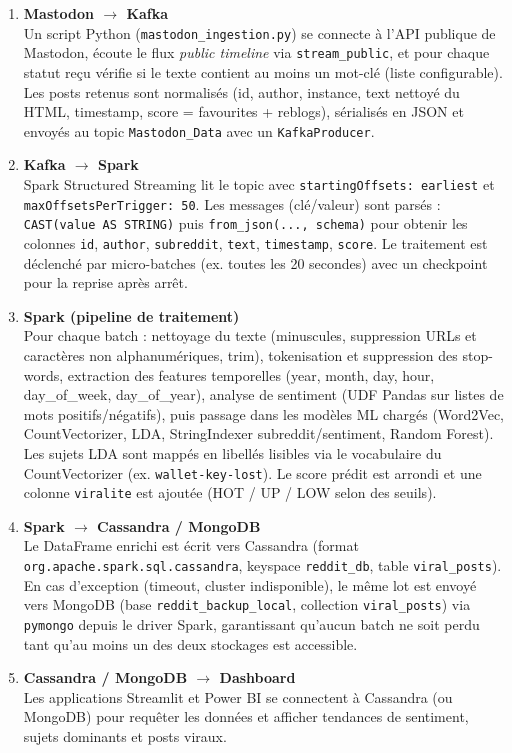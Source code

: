 \documentclass[12pt,a4paper]{article}
\begin{document}
\begin{enumerate}[leftmargin=*]
  \item \textbf{Mastodon $\rightarrow$ Kafka} \\
  Un script Python (\texttt{mastodon\_ingestion.py}) se connecte à l'API publique de Mastodon, écoute le flux \emph{public timeline} via \texttt{stream\_public}, et pour chaque statut reçu vérifie si le texte contient au moins un mot-clé (liste configurable). Les posts retenus sont normalisés (id, author, instance, text nettoyé du HTML, timestamp, score = favourites + reblogs), sérialisés en JSON et envoyés au topic \texttt{Mastodon\_Data} avec un \texttt{KafkaProducer}.
  \item \textbf{Kafka $\rightarrow$ Spark} \\
  Spark Structured Streaming lit le topic avec \texttt{startingOffsets: earliest} et \texttt{maxOffsetsPerTrigger: 50}. Les messages (clé/valeur) sont parsés : \texttt{CAST(value AS STRING)} puis \texttt{from\_json(..., schema)} pour obtenir les colonnes \texttt{id}, \texttt{author}, \texttt{subreddit}, \texttt{text}, \texttt{timestamp}, \texttt{score}. Le traitement est déclenché par micro-batches (ex. toutes les 20 secondes) avec un checkpoint pour la reprise après arrêt.
  \item \textbf{Spark (pipeline de traitement)} \\
  Pour chaque batch : nettoyage du texte (minuscules, suppression URLs et caractères non alphanumériques, trim), tokenisation et suppression des stop-words, extraction des features temporelles (year, month, day, hour, day\_of\_week, day\_of\_year), analyse de sentiment (UDF Pandas sur listes de mots positifs/négatifs), puis passage dans les modèles ML chargés (Word2Vec, CountVectorizer, LDA, StringIndexer subreddit/sentiment, Random Forest). Les sujets LDA sont mappés en libellés lisibles via le vocabulaire du CountVectorizer (ex. \texttt{wallet-key-lost}). Le score prédit est arrondi et une colonne \texttt{viralite} est ajoutée (HOT / UP / LOW selon des seuils).
  \item \textbf{Spark $\rightarrow$ Cassandra / MongoDB} \\
  Le DataFrame enrichi est écrit vers Cassandra (format \texttt{org.apache.spark.sql.cassandra}, keyspace \texttt{reddit\_db}, table \texttt{viral\_posts}). En cas d'exception (timeout, cluster indisponible), le même lot est envoyé vers MongoDB (base \texttt{reddit\_backup\_local}, collection \texttt{viral\_posts}) via \texttt{pymongo} depuis le driver Spark, garantissant qu'aucun batch ne soit perdu tant qu'au moins un des deux stockages est accessible.
  \item \textbf{Cassandra / MongoDB $\rightarrow$ Dashboard} \\
  Les applications Streamlit et Power BI se connectent à Cassandra (ou MongoDB) pour requêter les données et afficher tendances de sentiment, sujets dominants et posts viraux.
\end{enumerate}
\end{document}
